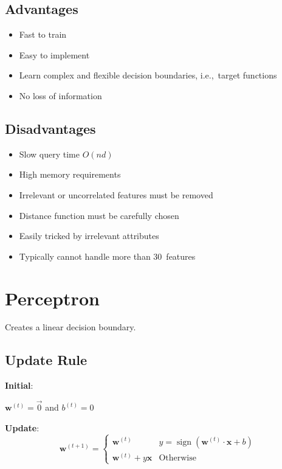 \documentclass[10pt]{article}
\DeclareMathOperator*{\sign}{sign}
\begin{document}
\begin{multicols}{3}
  \subsection*{Advantages}
  \begin{itemize}
    \item Fast to train
    \item Easy to implement
    \item Learn complex and flexible decision boundaries, i.e.,~target functions
    \item No loss of information
  \end{itemize}

  \subsection*{Disadvantages}
  \begin{itemize}
    \item Slow query time $O(nd)$
    \item High memory requirements
    \item Irrelevant or uncorrelated features must be removed
    \item Distance function must be carefully chosen
    \item Easily tricked by irrelevant attributes
    \item Typically cannot handle more than 30~features
  \end{itemize}

  \section{Perceptron}

  Creates a linear decision boundary.

  \subsection*{Update Rule}
  \textbf{Initial}:

  $\mathbf{w}^{(t)} = \vec{0}$ and $b^{(t)}=0$

  \textbf{Update}:
  \[ \mathbf{w}^{(t+1)} = \begin{cases}
                            \mathbf{w}^{(t)}                  & y = \sign(\mathbf{w}^{(t)}\cdot\mathbf{x} +b) \\
                            \mathbf{w}^{(t)} + y\mathbf{x}    & \text{Otherwise}
                          \end{cases} \]


\end{multicols}
\end{document}
